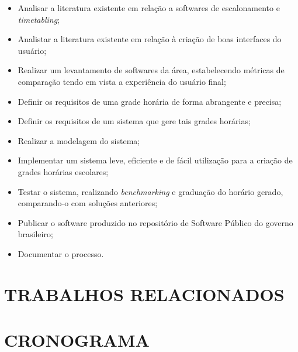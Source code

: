 \documentclass[12pt,a4paper]{article}
\begin{document}
				\begin{itemize}
					\item Analisar a literatura existente em relação a softwares de escalonamento e \textit{timetabling};
					\item Analistar a literatura existente em relação à criação de boas interfaces do usuário;
					\item Realizar um levantamento de softwares da área, estabelecendo métricas de comparação tendo em vista a experiência do usuário final;
					\item Definir os requisitos de uma grade horária de forma abrangente e precisa;
					\item Definir os requisitos de um sistema que gere tais grades horárias;
					\item Realizar a modelagem do sistema;
					\item Implementar um sistema leve, eficiente e de fácil utilização para a criação de grades horárias escolares;
					\item Testar o sistema, realizando \textit{benchmarking} e graduação do horário gerado, comparando-o com soluções anteriores;
					\item Publicar o software produzido no repositório de Software Público do governo brasileiro;
					\item Documentar o processo.
				\end{itemize}

	\section{TRABALHOS RELACIONADOS}

		\lipsum[1]

	\section{CRONOGRAMA}
\end{document}
